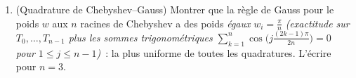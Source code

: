 \begin{problem}
\begin{enumerate}[resume]
{        limites $\theta \to 0, \pi$)}~: des polynômes bornés
        par $1$ sur $\intcc{-1}1$ peuvent avoir une dérivée
        aussi grande que $n^2$ au bord (l'inégalité de Markov
        dit pas plus --- énoncé seulement). Où dans
        l'intervalle la borne de dérivée n'est-elle que
        $O(n)$~?
  \item (Quadrature de Chebyshev--Gauss) Montrer que la règle
        de Gauss pour le poids $w$ aux $n$ racines de
        Chebyshev a des poids \emph{égaux} $w_i = \frac\pi n$
        \emph{(exactitude sur $T_0, \dots, T_{n-1}$ plus les
        sommes trigonométriques
        $\sum_{k=1}^n\cos\bigl(j\tfrac{(2k-1)\pi}{2n}\bigr) =
        0$ pour $1 \leq j \leq n - 1$)}~: la plus uniforme de
        toutes les quadratures. L'écrire pour $n = 3$.
\end{enumerate}


\end{problem}
